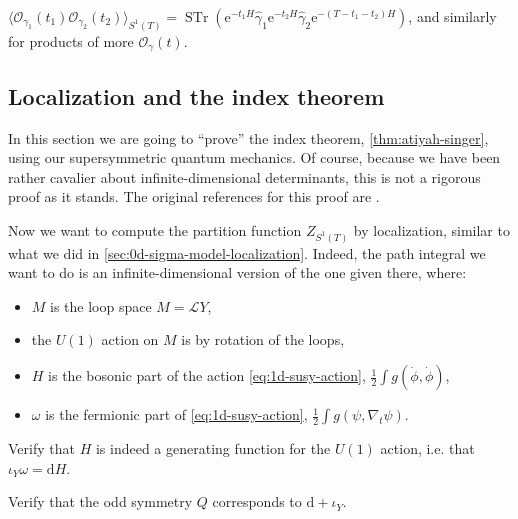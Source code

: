\documentclass[12pt,letterpaper,reqno]{article}
\numberwithin{equation}{section}
\newcommand{\cL}{\ensuremath{\mathcal L}}
\newcommand{\cO}{\ensuremath{\mathcal O}}
\newcommand{\half}{\ensuremath{\frac{1}{2}}}
\newcommand{\e}{{\mathrm e}}
\newcommand{\de}{\mathrm{d}}
\newcommand{\IP}[1]{\langle#1\rangle}
\DeclareMathOperator{\STr}{STr}
\newcommand{\fixme}[1]{{\color{orange}{[#1]}}}
\begin{document}
\begin{prop} 
$\IP{\cO_{\gamma_1}(t_1) \cO_{\gamma_2}(t_2)}_{S^1(T)} = \STr (\e^{-t_1 H} \hat\gamma_1 \e^{-t_2 H} \hat\gamma_2 \e^{-(T-t_1-t_2)H})$,
and similarly for products of more $\cO_\gamma(t)$.
\end{prop}

\fixme{give some sketch proof? discretization?}

\fixme{supercurrent which maps to the Dirac operator}


\subsection{Localization and the index theorem} \label{sec:localization-index}

In this section we are going to ``prove'' the index theorem,
\autoref{thm:atiyah-singer}, using our supersymmetric quantum mechanics.
Of course, because we have been rather cavalier about infinite-dimensional
determinants, this is not a rigorous proof as it stands.
The original references for this proof are 
\cite{Alvarez-Gaume1983b,MR816738,MR87i:81237}.

Now we want to compute the partition function $Z_{S^1(T)}$ by localization,
similar to what we did in \autoref{sec:0d-sigma-model-localization}.
Indeed, the path integral we want to do is an infinite-dimensional
version of the one given there, where:
\begin{itemize} 
\item $M$ is the loop space $M = \cL Y$,
\item the $U(1)$ action on $M$ is by rotation of the loops,
\item $H$ is the bosonic part of the action \eqref{eq:1d-susy-action}, $\half \int g(\dot\phi,\dot\phi)$,
\item $\omega$ is the fermionic part of \eqref{eq:1d-susy-action}, $\half \int g(\psi, \nabla_t \psi)$.
\end{itemize}

\begin{exercise} Verify that $H$ is indeed a generating function for the $U(1)$ action, i.e.
that $\iota_Y \omega = \de H$. \fixme{watch out for factor of 2 here}
\end{exercise}

\begin{exercise} Verify that the odd symmetry $Q$ corresponds to $\de + \iota_Y$.
\end{exercise}
\fixme{notation problem: used $Y$ for the vector field earlier, now using it for target}
\end{document}
